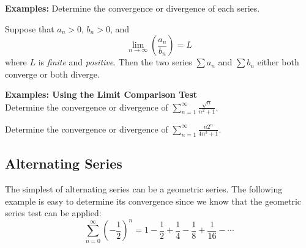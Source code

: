 \documentclass[addpoints, 12pt]{exam}
\begin{document}
\noindent\textbf{Examples:} Determine the convergence or divergence of each series.

\newpage

\begin{tcolorbox}[title= THE LIMIT COMPARISON TEST,colframe=black,sharp corners,colback=white,colbacktitle=white,coltitle=black]

    Suppose that $a_n>0,\,b_n>0$, and
    \[\lim_{n\to\infty}\left(\frac{a_n}{b_n}\right)=L\]
    where $L$ is \textit{finite} and \textit{positive}. Then the two series $\displaystyle\sum a_n$ and $\displaystyle\sum b_n$ either both converge or both diverge.

\end{tcolorbox}
\vspace{.1in}
\noindent\textbf{Examples: Using the Limit Comparison Test}\\
Determine the convergence or divergence of $\displaystyle\sum_{n=1}^{\infty}\frac{\sqrt{n}}{n^2+1}$.


Determine the convergence or divergence of $\displaystyle\sum_{n=1}^\infty\frac{n2^n}{4n^3+1}$.




\newpage
{}
\subsection*{Alternating Series}
The simplest of alternating series can be a geometric series. The following example is easy to determine its convergence since we know that the geometric series test can be applied:
\[\sum_{n=0}^{\infty}\left(-\frac{1}{2}\right)^n=1-\frac{1}{2}+\frac{1}{4}-\frac{1}{8}+\frac{1}{16}-\cdots\]
\end{document}
